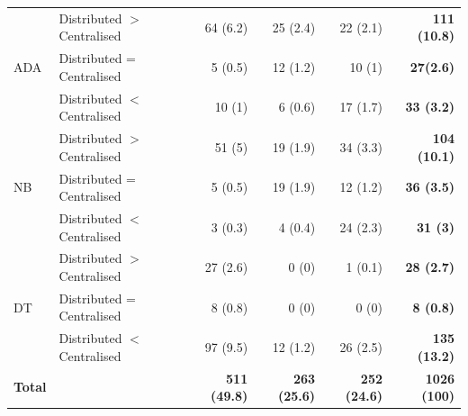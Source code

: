 {\begin{table}[h]
\begin{tabular}{llrrrr}

\hline \multirow{3}{*}{ADA} & Distributed $>$ Centralised & 64 (6.2) & 25 (2.4) & 22 (2.1) & \textbf{111 (10.8)} \\
 & Distributed =  Centralised& 5 (0.5) & 12 (1.2) & 10 (1) & \textbf{27(2.6)} \\
 & Distributed $<$ Centralised & 10 (1) & 6 (0.6) & 17 (1.7) & \textbf{33 (3.2)} \\


\hline \multirow{3}{*}{NB} & Distributed $>$ Centralised & 51 (5) & 19 (1.9) & 34 (3.3) & \textbf{104 (10.1) } \\
 &  Distributed =  Centralised & 5 (0.5) & 19 (1.9) & 12 (1.2) & \textbf{36 (3.5)} \\
 & Distributed $<$ Centralised  & 3 (0.3) & 4 (0.4) & 24 (2.3) & \textbf{31 (3)} \\


\hline \multirow{3}{*}{ DT} & Distributed $>$ Centralised & 27 (2.6) & 0 (0) & 1 (0.1) & \textbf{28 (2.7)} \\
 & Distributed = Centralised & 8 (0.8) & 0 (0) & 0 (0)& \textbf{8 (0.8)} \\
 & Distributed $<$ Centralised & 97 (9.5) & 12 (1.2) & 26 (2.5) & \textbf{135 (13.2)} \\

 
 \hline
  \textbf{Total} &  & \textbf{511 (49.8)} & \textbf{263 (25.6)} & \textbf{252 (24.6)} & \textbf{1026 (100)}\\
 \bottomrule
\end{tabular}
\end{table}
}















